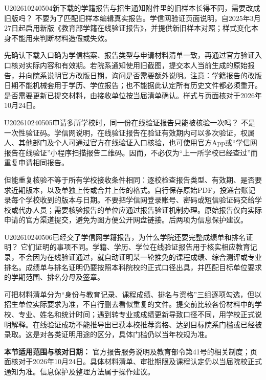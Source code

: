 \begin{qa}{U202610240504}{新下载的学籍报告与招生通知附件里的旧样本长得不同，需要改成旧版吗？}
不要为了匹配旧样本编辑真实报告。学信网验证页面说明，自2025年3月27日起启用新版《教育部学籍在线验证报告》，并提供新旧样本对照；样式变化本身不能用来判断材料造假或失效。 

先确认下载入口确为学信档案、报告类型与申请材料清单一致，再通过官方验证入口核对实际内容和有效期。若院系通知使用旧截图，提交本人当前生成的原始报告，并向院系说明官方改版日期，询问是否需要额外说明。注意：学籍报告的改版日期不能机械套用于学历、学位报告；也不能据此认定所有历史文件都必须重开。是否需要更新已提交材料，由接收单位按当届清单确认。样式与页面核对于2026年10月24日。
\end{qa}
\begin{qa}{U202610240505}{申请多所学校时，同一份在线验证报告只能被核验一次吗？}
不是一次性验证码。学信网说明，在线验证报告在验证有效期内可以多次验证，权属人、其他部门及个人可通过官方在线验证入口核验，也可使用官方App或“学信网报告在线验证”小程序扫描报告二维码。因而，不必仅为“上一所学校已经查过”而重复申请相同报告。

但能重复核验不等于所有学校接收条件相同：逐校检查报告类型、有效期、是否要求近期版本，以及单独上传或合并上传的格式。自行保存原始PDF，投递台账记录每个学校收到的版本与日期。不要把学信网登录账号、密码或短信验证码交给学校或代办人员；需要核验报告的单位应通过报告验证机制办理。原始报告仅向实际申请的官方渠道提交，避免为图方便公开网盘链接。后两项为信息保护建议。
\end{qa}
\begin{qa}{U202610240506}{已经交了学信网学籍报告，为什么学院还要完整成绩单和排名证明？}
它们证明的事项不同。学籍、学历、学位在线验证报告用于核实相应教育记录，不会因为在线验证通过，就自动证明某一轮推免的课程成绩、综合测评或专业排名。成绩单与排名证明仍要按照本科院校的正式口径出具，并匹配目标单位要求的学期范围、排名分母及签章。

可把材料清单分为“身份与教育记录、课程成绩、排名与资格”三组逐项勾选，但以招生单位实际要求为准，不自行删去看似重复的文件。提交前比较各份材料中的学校、专业、姓名和统计时间；遇到转专业或成绩更新导致口径不同，用学校正式说明解释。在线验证成功不能推导出已获本校推荐资格、达到目标院系门槛或已经被录取。这是对各类证明用途的区分，具体门槛仍以当年校规为准。
\end{qa}
\par\textbf{本节适用范围与核对日期：} 官方报告服务说明及教育部令第41号的相关制度；页面核对于2026年10月24日。具体材料清单、审批期限及课程认定仍以当届院校正式通知为准。信息保护及整理方法属于操作建议。

